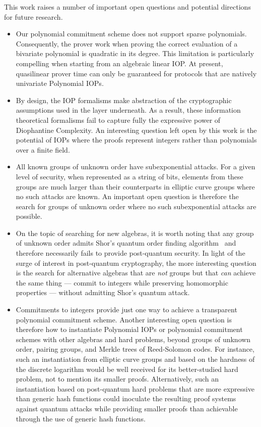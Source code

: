 This work raises a number of important open questions and potential directions for future research.
\begin{itemize}
 \item Our polynomial commitment scheme does not support sparse polynomials. Consequently, the prover work when proving the correct evaluation of a bivariate polynomial is quadratic in its degree. This limitation is particularly compelling when starting from an algebraic linear IOP. At present, quasilinear prover time can only be guaranteed for protocols that are natively univariate Polynomial IOPs. 

 \item By design, the IOP formalisms make abstraction of the cryptographic assumptions used in the layer underneath. As a result, these information theoretical formalisms fail to capture fully the expressive power of Diophantine Complexity. An interesting question left open by this work is the potential of IOPs where the proofs represent integers rather than polynomials over a finite field.
 
 \item All known groups of unknown order have subexponential attacks. For a given level of security, when represented as a string of bits, elements from these groups are much larger than their counterparts in elliptic curve groups where no such attacks are known. An important open question is therefore the search for groups of unknown order where no such subexponential attacks are possible. 
 
 \item On the topic of searching for new algebras, it is worth noting that any group of unknown order admits Shor's quantum order finding algorithm~\cite{conf/focs/Shor94} and therefore necessarily fails to provide post-quantum security. In light of the surge of interest in post-quantum cryptography, the more interesting question is the search for alternative algebras that are \emph{not} groups but that \emph{can} achieve the same thing --- commit to integers while preserving homomorphic properties --- without admitting Shor's quantum attack. 

 \item Commitments to integers provide just one way to achieve a transparent polynomial commitment scheme. Another interesting open question is therefore how to instantiate Polynomial IOPs or polynomial commitment schemes with other algebras and hard problems, beyond groups of unknown order, pairing groups, and Merkle trees of Reed-Solomon codes. For instance, such an instantiation from elliptic curve groups and based on the hardness of the discrete logarithm would be well received for its better-studied hard problem, not to mention its smaller proofs. Alternatively, such an instantiation based on post-quantum hard problems that are more expressive than generic hash functions could inoculate the resulting proof systems against quantum attacks while providing smaller proofs than achievable through the use of generic hash functions.
\end{itemize}

